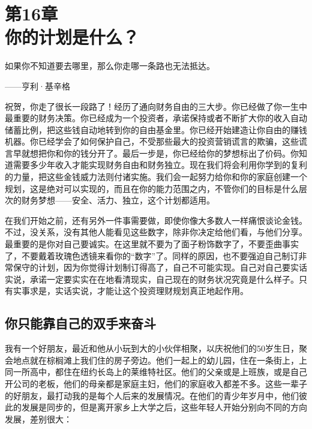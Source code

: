 
\section[第16章\q 你的计划是什么？]{第16章\\ 你的计划是什么？}

\begin{BookQuote}
如果你不知道要去哪里，那么你走哪一条路也无法抵达。

\hfill ——亨利·基辛格
\end{BookQuote}

祝贺，你走了很长一段路了！经历了通向财务自由的三大步。你已经做了你一生中最重要的财务决策。你已经成为一个投资者，承诺保持或者不断扩大你的收入自动储蓄比例，把这些钱自动地转到你的自由基金里。你已经开始建造让你自由的赚钱机器。你已经学会了如何保护自己，不受那些最大的投资营销谎言的欺骗，这些谎言早就想把你和你的钱分开了。最后一步是，你已经给你的梦想标出了价码。你知道需要多少年收入才能实现财务自由和财务独立。现在我们将会利用你学到的复利的力量，把这些金钱威力法则付诸实施。我们会一起努力给你和你的家庭创建一个规划，这是绝对可以实现的，而且在你的能力范围之内，不管你们的目标是什么层次的财务梦想——安全、活力、独立，这个计划都适用。

在我们开始之前，还有另外一件事需要做，即使你像大多数人一样痛恨谈论金钱。不过，没关系，没有其他人能看见这些数字，除非你决定给他们看，与他们分享。最重要的是你对自己要诚实。在这里就不要为了面子粉饰数字了，不要歪曲事实了，不要戴着玫瑰色透镜来看你的“数字”了。同样的原因，也不要强迫自己制订非常保守的计划，因为你觉得计划制订得高了，自己不可能实现。自己对自己要实话实说，承诺一定要实实在在地看清现实，自己现在的财务状况究竟是什么样子。只有实事求是，实话实说，才能让这个投资理财规划真正地起作用。

\subsection{你只能靠自己的双手来奋斗}

我有一个好朋友，最近和他从小玩到大的小伙伴相聚，以庆祝他们的50岁生日，聚会地点就在棕榈滩上我们住的房子旁边。他们一起上的幼儿园，住在一条街上，上同一所高中，都住在纽约长岛上的莱维特社区。他们的父亲或是上班族，或是自己开公司的老板，他们的母亲都是家庭主妇，他们的家庭收入都差不多。这些一辈子的好朋友，最打动我的是每个人后来的发展情况。在他们的青少年岁月中，他们彼此的发展是同步的，但是离开家乡上大学之后，这些年轻人开始分别向不同的方向发展，差别很大：

